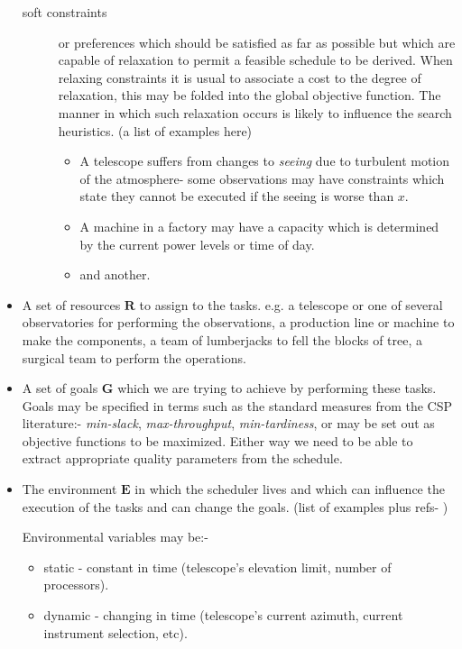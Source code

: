 \begin{itemize}
\begin{description}
 \item[soft constraints] or preferences which should be satisfied as far as possible but which are capable of relaxation to permit a feasible schedule to be derived. When relaxing constraints it is usual to associate a cost to the degree of relaxation, this  may be folded into the global objective function. The manner in which such relaxation occurs is likely to influence the search heuristics.
 (a list of examples here)
\begin{itemize}
 \item A telescope suffers from changes to \emph{seeing} due to turbulent motion of the atmosphere- some observations may have constraints which state they cannot be executed if the seeing is worse than $x$. 
 \item A machine in a factory may have a capacity which is determined by the current power levels or time of day.
 \item and another.
\end{itemize}

\end{description}

\item A set of resources $\mathbf{R}$ to assign to the tasks. e.g. a telescope or one of several observatories for performing the observations, a production line or machine to make the components, a team of lumberjacks to fell the blocks of tree, a surgical team to perform the operations.

\item A set of goals $\mathbf{G}$ which we are trying to achieve by performing these tasks. Goals may be specified in terms such as the standard measures from the CSP literature:- \emph{min-slack}, \emph{max-throughput}, \emph{min-tardiness}, or may be set out as objective functions to be maximized. Either way we need to be able to extract appropriate quality parameters from the schedule. 

\item The environment $\mathbf{E}$ in which the scheduler lives and which can influence the execution of the tasks and can change the goals. (list of examples plus refs- ) 

Environmental variables may be:- 

\begin{itemize}
  \item static - constant in time (telescope's elevation limit, number of processors).
  \item dynamic - changing in time (telescope's current azimuth, current instrument selection, etc).


\end{itemize}
\end{itemize}
